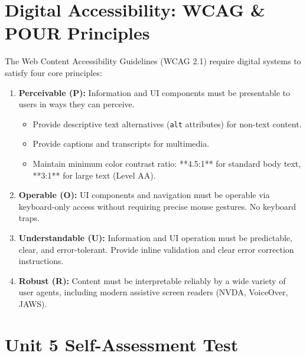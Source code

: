 \section{Digital Accessibility: WCAG \& POUR Principles}

The Web Content Accessibility Guidelines (WCAG 2.1) require digital systems to satisfy four core principles:
\begin{enumerate}[leftmargin=1.2em, itemsep=3pt]
    \item \textbf{Perceivable (P):} Information and UI components must be presentable to users in ways they can perceive.
    \begin{itemize}
        \item Provide descriptive text alternatives (\texttt{alt} attributes) for non-text content.
        \item Provide captions and transcripts for multimedia.
        \item Maintain minimum color contrast ratio: **4.5:1** for standard body text, **3:1** for large text (Level AA).
    \end{itemize}
    \item \textbf{Operable (O):} UI components and navigation must be operable via keyboard-only access without requiring precise mouse gestures. No keyboard traps.
    \item \textbf{Understandable (U):} Information and UI operation must be predictable, clear, and error-tolerant. Provide inline validation and clear error correction instructions.
    \item \textbf{Robust (R):} Content must be interpretable reliably by a wide variety of user agents, including modern assistive screen readers (NVDA, VoiceOver, JAWS).
\end{enumerate}

\section{Unit 5 Self-Assessment Test}


